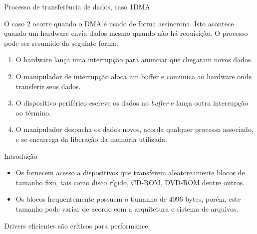 \begin{frame}{Processo de transferência de dados, caso 1}{DMA}

  O caso 2 ocorre quando o DMA é usado de forma assíncrona. Isto acontece 
  quando um hardware envia dados mesmo quando não há requisição. O processo 
  pode ser resumido da seguinte forma:
  \begin{enumerate}
  \item<1> O hardware lança uma interrupção para anunciar que chegaram
    novos dados.
  \item<2-> O manipulador de interrupção aloca um buffer e comunica ao 
    hardware onde transferir seus dados.
  \item<3-> O dispositivo periférico escreve os dados no {\it buffer}
    e lança outra interrupção ao término.
  \item<4-> O manipulador despacha os dados novos, acorda qualquer processo 
    associado, e se encarrega da liberação da memória utilizada.
  \end{enumerate}

\end{frame}


\begin{frame}{\insertlecture}{Introdução}

  \begin{itemize}
  \item Os \alert{\insertlecture} fornecem acesso a dispositivos que
    transferem aleatoreamente blocos de tamanho fixo, tais como disco
    rígido, CD-ROM, DVD-ROM dentre outros.
  \item Os blocos frequentemente possuem o tamanho de \alert{4096
      bytes}, porém, este tamanho pode variar de acordo com a
    arquitetura e sistema de arquivos.
  \end{itemize}

  Drivers eficientes são críticos para performance.

\end{frame}


